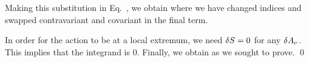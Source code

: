 {	Making this substitution in Eq.~, we obtain
	where we have changed indices and swapped contravariant and covariant in the final term.
	
	In order for the action to be at a local extremum, we need $\delta S = 0$ for any $\delta A_\nu$.  This implies that the integrand is 0.  Finally, we obtain
	as we sought to prove. \qed
}

%
%


